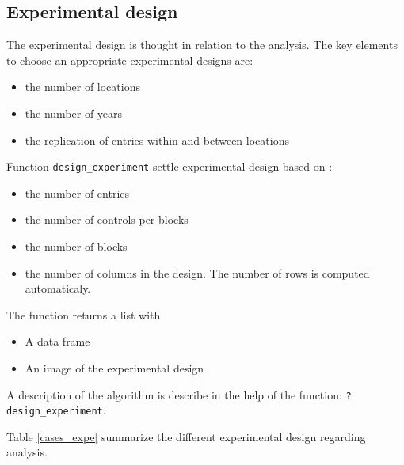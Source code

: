 \documentclass{book}\usepackage[]{graphicx}\usepackage[]{color}
\begin{document}
\subsection{Experimental design}

The experimental design is thought in relation to the analysis.
The key elements to choose an appropriate experimental designs are:
\begin{itemize}
\item the number of locations
\item the number of years
\item the replication of entries within and between locations
\end{itemize}

\noindent Function \texttt{design\_experiment} settle experimental design based on :
\begin{itemize}
\item the number of entries
\item the number of controls per blocks
\item the number of blocks
\item the number of columns in the design. The number of rows is computed automaticaly.
\end{itemize}

\noindent The function returns a list with
\begin{itemize}
\item A data frame
\item An image of the experimental design
\end{itemize}

\noindent A description of the algorithm is describe in the help of the function: \texttt{?design\_experiment}.

\noindent Table \ref{cases_expe} summarize the different experimental design regarding analysis.
\end{document}
